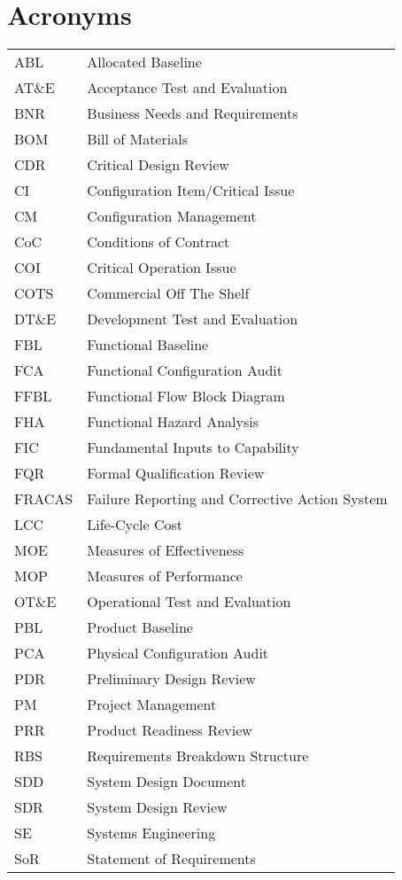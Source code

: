 \documentclass[journal]{IEEEtran}
\begin{document}
\section{Acronyms}
\begin{tabular}{ l l }
ABL & Allocated Baseline \\ 
AT\&E & Acceptance Test and Evaluation \\
BNR & Business Needs and Requirements \\
BOM & Bill of Materials \\
CDR & Critical Design Review \\
CI & Configuration Item/Critical Issue \\
CM & Configuration Management \\
CoC & Conditions of Contract \\
COI & Critical Operation Issue \\
COTS & Commercial Off The Shelf \\
DT\&E & Development Test and Evaluation \\
FBL & Functional Baseline \\
FCA & Functional Configuration Audit \\
FFBL & Functional Flow Block Diagram \\
FHA & Functional Hazard Analysis \\
FIC & Fundamental Inputs to Capability \\
FQR & Formal Qualification Review \\
FRACAS & Failure Reporting and Corrective Action System \\
LCC & Life-Cycle Cost \\
MOE & Measures of Effectiveness \\
MOP & Measures of Performance \\
OT\&E & Operational Test and Evaluation \\
PBL & Product Baseline \\
PCA & Physical Configuration Audit \\
PDR & Preliminary Design Review \\
PM & Project Management \\
PRR & Product Readiness Review \\
RBS & Requirements Breakdown Structure \\
SDD & System Design Document \\
SDR & System Design Review \\
SE & Systems Engineering \\
SoR & Statement of Requirements \\

\end{tabular}
\end{document}

